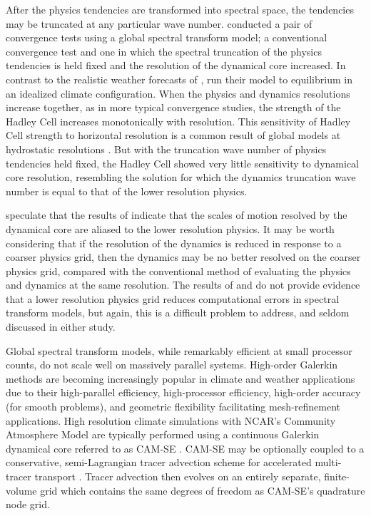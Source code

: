 \documentclass{agujournal}
\begin{document}
After the physics tendencies are transformed into spectral space, the tendencies may be truncated at any particular wave number. \cite{W1999T} conducted a pair of convergence tests using a global spectral transform model; a conventional convergence test and one in which the spectral truncation of the physics tendencies is held fixed and the resolution of the dynamical core increased. In contrast to the realistic weather forecasts of \cite{W2014PTRSL}, \cite{W1999T} run their model to equilibrium in an idealized climate configuration. When the physics and dynamics resolutions increase together, as in more typical convergence studies, the strength of the Hadley Cell increases monotonically with resolution. This sensitivity of Hadley Cell strength to horizontal resolution is a common result of global models at hydrostatic resolutions \citep[see][and references therein]{HR2017JCLIM}. But with the truncation wave number of physics tendencies held fixed, the Hadley Cell showed very little sensitivity to dynamical core resolution, resembling the solution for which the dynamics truncation wave number is equal to that of the lower resolution physics. 

\cite{HR2017JCLIM} speculate that the results of \cite{W1999T} indicate that the scales of motion resolved by the dynamical core are aliased to the lower resolution physics. It may be worth considering that if the resolution of the dynamics is reduced in response to a coarser physics grid, then the dynamics may be no better resolved on the coarser physics grid, compared with the conventional method of evaluating the physics and dynamics at the same resolution. The results of \cite{W1999T} and \cite{W2014PTRSL} do not provide evidence that a lower resolution physics grid reduces computational errors in spectral transform models, but again, this is a difficult problem to address, and seldom discussed in either study.  

Global spectral transform models, while remarkably efficient at small processor counts, do not scale well on massively parallel systems. High-order Galerkin methods are becoming increasingly popular in climate and weather applications due to their high-parallel efficiency, high-processor efficiency, high-order accuracy (for smooth problems), and geometric flexibility facilitating mesh-refinement applications. High resolution climate simulations with NCAR's Community Atmosphere Model \citep[CAM;][]{CAM5} are typically performed using a continuous Galerkin dynamical core referred to as CAM-SE \citep[CAM Spectral Elements;][]{TES2008JPCS,DetAl2012IJHPCA,LetAl2018JAMES}. CAM-SE may be optionally coupled to a conservative, semi-Lagrangian tracer advection scheme for accelerated multi-tracer transport \citep[CAM-SE-CSLAM;][]{LTOUNGK2017MWR}. Tracer advection then evolves on an entirely separate, finite-volume grid which contains the same degrees of freedom as CAM-SE's quadrature node grid.
\end{document}
